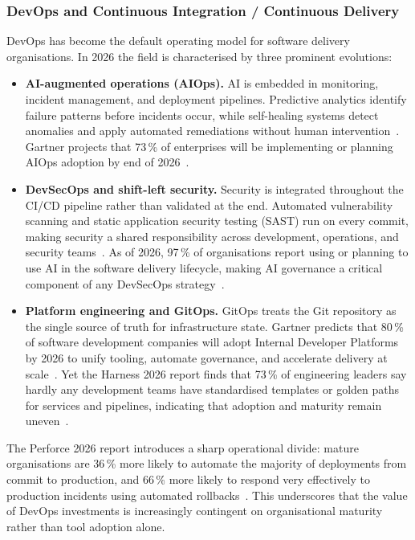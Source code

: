  
\subsubsection{DevOps and Continuous Integration / Continuous
Delivery}\label{subsub:sota:devops}
 
DevOps has become the default operating model for software delivery
organisations. In 2026 the field is characterised by three prominent
evolutions:
 
\begin{itemize}
    \item \textbf{AI-augmented operations (AIOps).}
    AI is embedded in monitoring, incident management, and deployment
    pipelines. Predictive analytics identify failure patterns before
    incidents occur, while self-healing systems detect anomalies and
    apply automated remediations without human
    intervention~\cite{devopsdotcom2025}. Gartner projects that
    73\,\% of enterprises will be implementing or planning AIOps
    adoption by end of 2026~\cite{fullstack2026aidevops}.
 
    \item \textbf{DevSecOps and shift-left security.}
    Security is integrated throughout the CI/CD pipeline rather than
    validated at the end. Automated vulnerability scanning and static
    application security testing (SAST) run on every commit, making
    security a shared responsibility across development, operations,
    and security teams~\cite{graphite2025}. As of 2026, 97\,\% of
    organisations report using or planning to use AI in the software
    delivery lifecycle, making AI governance a critical component of
    any DevSecOps strategy~\cite{devsecops2026}.
 
    \item \textbf{Platform engineering and GitOps.}
    GitOps treats the Git repository as the single source of truth
    for infrastructure state. Gartner predicts that 80\,\% of
    software development companies will adopt Internal Developer
    Platforms by 2026 to unify tooling, automate governance, and
    accelerate delivery at scale~\cite{fullstack2026aidevops}.
    Yet the Harness 2026 report finds that 73\,\% of engineering
    leaders say hardly any development teams have standardised
    templates or golden paths for services and pipelines, indicating
    that adoption and maturity remain
    uneven~\cite{harness2026devops}.
\end{itemize}
 
The Perforce 2026 report introduces a sharp operational divide: mature
organisations are 36\,\% more likely to automate the majority of
deployments from commit to production, and 66\,\% more likely to
respond very effectively to production incidents using automated
rollbacks~\cite{perforce2026devops}. This underscores that
the value of DevOps investments is increasingly contingent on
organisational maturity rather than tool adoption alone.
 
